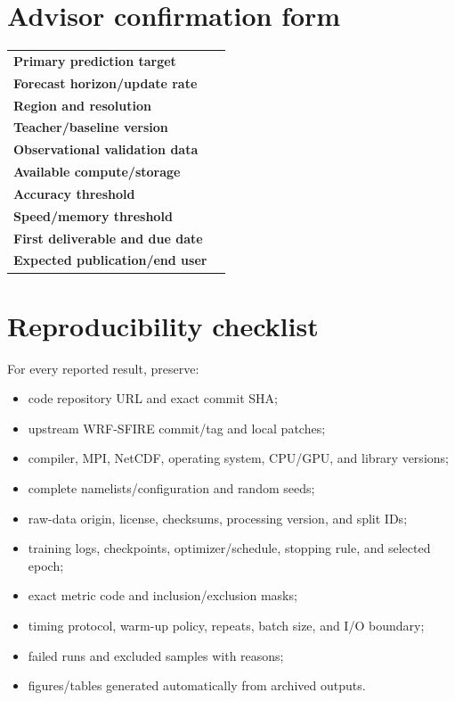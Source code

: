 \documentclass[11pt]{article}
\begin{document}
\appendix
\section{Advisor confirmation form}

\begin{tabularx}{\textwidth}{>{\bfseries}p{}X}
Primary prediction target & \hrulefill \\
Forecast horizon/update rate & \hrulefill \\
Region and resolution & \hrulefill \\
Teacher/baseline version & \hrulefill \\
Observational validation data & \hrulefill \\
Available compute/storage & \hrulefill \\
Accuracy threshold & \hrulefill \\
Speed/memory threshold & \hrulefill \\
First deliverable and due date & \hrulefill \\
Expected publication/end user & \hrulefill \\
\end{tabularx}

\section{Reproducibility checklist}

For every reported result, preserve:
\begin{itemize}
  \item code repository URL and exact commit SHA;
  \item upstream WRF-SFIRE commit/tag and local patches;
  \item compiler, MPI, NetCDF, operating system, CPU/GPU, and library versions;
  \item complete namelists/configuration and random seeds;
  \item raw-data origin, license, checksums, processing version, and split IDs;
  \item training logs, checkpoints, optimizer/schedule, stopping rule, and selected epoch;
  \item exact metric code and inclusion/exclusion masks;
  \item timing protocol, warm-up policy, repeats, batch size, and I/O boundary;
  \item failed runs and excluded samples with reasons;
  \item figures/tables generated automatically from archived outputs.
\end{itemize}
\end{document}
